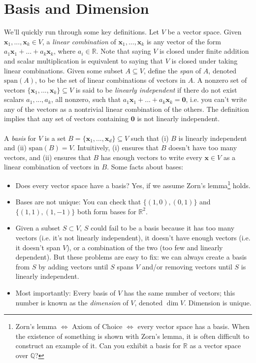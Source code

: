 \documentclass{article}
\newcommand{\R}{\mathbb{R}}
\newcommand{\Q}{\mathbb{Q}}
\newcommand{\tit}{\textit}
\newcommand{\tbf}{\textbf}
\begin{document}
\section{Basis and Dimension}
We'll quickly run through some key definitions. Let $V$ be a vector space. Given $\tbf{x}_1, ..., \tbf{x}_k \in V$, a \tit{linear combination} of $\tbf{x}_1, ..., \tbf{x}_k$ is any vector of the form $a_1\tbf{x}_1 + ... + a_k\tbf{x}_k$, where $a_i \in \R$. Note that saying $V$ is closed under finite addition and scalar multiplication is equivalent to saying that $V$ is closed under taking linear combinations. Given some subset $A \subseteq V$, define the \tit{span} of $A$, denoted $\text{span}(A)$, to be the set of linear combinations of vectors in $A$.  A nonzero set of vectors $\{\tbf{x}_1, ... , \tbf{x}_k\} \subseteq V$ is said to be \tit{linearly independent} if there do not exist scalars $a_1, ... ,a_k$, all nonzero, such that $a_1\tbf{x}_1 + ... + a_k\tbf{x}_k = \mathbf{0}$, i.e. you can't write any of the vectors as a nontrivial linear combination of the others. The definition implies that any set of vectors containing $\tbf{0}$ is not linearly independent.
\\ \\
A \tit{basis} for $V$ is a set $B = \{\tbf{x}_1, ... , \tbf{x}_d\} \subseteq V$ such that (i) $B$ is linearly independent and (ii) $\text{span}(B) = V$. Intuitively, (i) ensures that $B$ doesn't have too many vectors, and (ii) ensures that $B$ has enough vectors to write every $\tbf{x} \in V$ as a linear combination of vectors in $B$. Some facts about bases: 
\begin{itemize}
\item Does every vector space have a basis? Yes, if we assume Zorn's lemma\footnote{Zorn's lemma $\iff$ Axiom of Choice $\iff$ every vector space has a basis. When the existence of something is shown with Zorn's lemma, it is often difficult to construct an example of it. Can you exhibit a basis for $\R$ as a vector space over $\Q$?} holds. 
\item Bases are not unique: You can check that $\{(1,0), (0,1)\}$ and $\{(1,1), (1,-1)\}$ both form bases for $\R^2$.
\item Given a subset $S \subset V$, $S$ could fail to be a basis because it has too many vectors (i.e. it's not linearly independent), it doesn't have enough vectors (i.e. it doesn't span $V$), or a combination of the two (too few and linearly dependent). But these problems are easy to fix: we can always create a basis from $S$ by adding vectors until $S$ spans $V$ and/or removing vectors until $S$ is linearly independent. 
\item Most importantly: Every basis of $V$ has the same number of vectors; this number is known as the \tit{dimension} of $V$, denoted $\dim{V}$. Dimension is unique.
\end{itemize}
\end{document}

